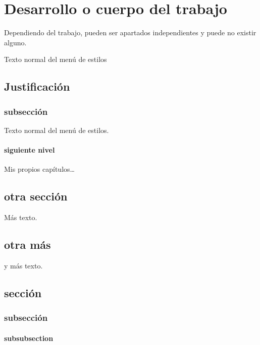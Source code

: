 \chapter{Desarrollo o cuerpo del trabajo}

Dependiendo del trabajo, pueden ser apartados independientes y puede no existir alguno.

Texto normal del menú de estilos

\section{Justificación}
\subsection{subsección}

Texto normal del menú de estilos.

\subsubsection{siguiente nivel}

Mis propios capítulos\dots

\section{otra sección}

Más texto.

\section{otra más}

y más texto.


\section{sección}
\subsection{subsección}
\subsubsection{subsubsection}